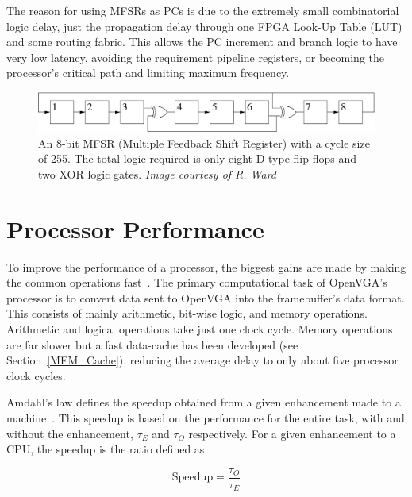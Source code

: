 The reason for using MFSRs as PCs is due to the extremely small combinatorial
logic delay, just the propagation delay through one FPGA Look-Up
Table (LUT) and some routing
fabric. This allows the PC increment and branch logic to have very low latency,
avoiding the requirement pipeline registers, or becoming the processor's critical
path and limiting maximum frequency.

\begin{figure}[h!]
\begin{center}
\includegraphics[width=\linewidth]{images/mfsr8.eps}
\caption[An 8-bit MFSR with a cycle size of 255]{An 8-bit MFSR (Multiple
Feedback Shift Register) with a cycle size of 255. The total logic required is
only eight D-type flip-flops and two XOR logic gates. \textit{Image courtesy
of R. Ward}~\cite{MFSR_List}}
\label{CPU_MFSR8}
\end{center}
\end{figure}


\section{Processor Performance}
To improve the performance of a processor, the biggest gains are made by making
the common operations fast~\cite{Comp_Arch}. The primary computational task of
OpenVGA's processor is to convert data sent to OpenVGA into the framebuffer's
data format. This consists of mainly arithmetic, bit-wise logic, and memory
operations. Arithmetic and logical operations take just one clock cycle. Memory
operations are far slower but a fast data-cache has been developed (see
Section~\ref{MEM_Cache}), reducing the average delay to only about five processor
clock cycles.


Amdahl's law defines the speedup obtained from a given enhancement made to a
machine~\cite{Comp_Arch}. This speedup is based on the performance for the entire
task, with and without the enhancement, $\tau_E$ and $\tau_O$ respectively. For a
given enhancement to a CPU, the speedup is the ratio defined as

\[
\mathrm{Speedup} = \frac{\tau_O}{\tau_E}
\]


